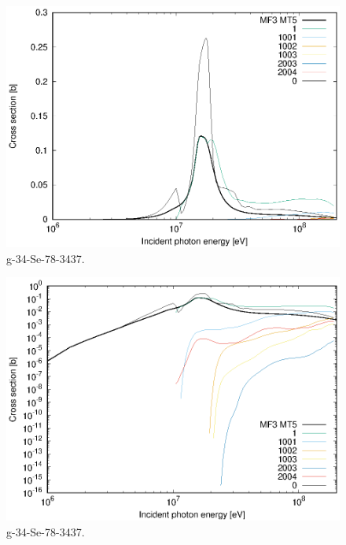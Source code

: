 \begin{figure}
 \includegraphics[width=\linewidth]{eps/g_34-Se-78_3437.eps}
  \caption{g-34-Se-78-3437.}
\end{figure}
\begin{figure}
 \includegraphics[width=\linewidth]{eps-log/g_34-Se-78_3437.eps}
 \caption{g-34-Se-78-3437.}
\end{figure}
\newpage \clearpage

